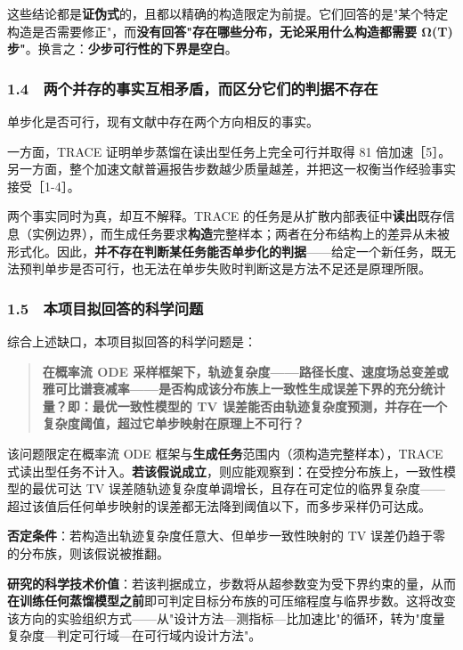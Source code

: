 \documentclass[12pt,a4paper]{ctexart}
\begin{document}
这些结论都是\textbf{证伪式}的，且都以精确的构造限定为前提。它们回答的是"某个特定构造是否需要修正"，而\textbf{没有回答"存在哪些分布，无论采用什么构造都需要 Ω(T) 步"}。换言之：\textbf{少步可行性的下界是空白}。

\subsubsection*{1.4　两个并存的事实互相矛盾，而区分它们的判据不存在}

单步化是否可行，现有文献中存在两个方向相反的事实。

一方面，TRACE 证明单步蒸馏在读出型任务上完全可行并取得 81 倍加速［5］。另一方面，整个加速文献普遍报告步数越少质量越差，并把这一权衡当作经验事实接受［1-4］。

两个事实同时为真，却互不解释。TRACE 的任务是从扩散内部表征中\textbf{读出}既存信息（实例边界），而生成任务要求\textbf{构造}完整样本；两者在分布结构上的差异从未被形式化。因此，\textbf{并不存在判断某任务能否单步化的判据}——给定一个新任务，既无法预判单步是否可行，也无法在单步失败时判断这是方法不足还是原理所限。

\subsubsection*{1.5　本项目拟回答的科学问题}

综合上述缺口，本项目拟回答的科学问题是：

\begin{quote}\small
\textbf{在概率流 ODE 采样框架下，轨迹复杂度——路径长度、速度场总变差或雅可比谱衰减率——是否构成该分布族上一致性生成误差下界的充分统计量？即：最优一致性模型的 TV 误差能否由轨迹复杂度预测，并存在一个复杂度阈值，超过它单步映射在原理上不可行？}

\end{quote}

该问题限定在概率流 ODE 框架与\textbf{生成任务}范围内（须构造完整样本），TRACE 式读出型任务不计入。\textbf{若该假说成立}，则应能观察到：在受控分布族上，一致性模型的最优可达 TV 误差随轨迹复杂度单调增长，且存在可定位的临界复杂度——超过该值后任何单步映射的误差都无法降到阈值以下，而多步采样仍可达成。

\textbf{否定条件}：若构造出轨迹复杂度任意大、但单步一致性映射的 TV 误差仍趋于零的分布族，则该假说被推翻。

\textbf{研究的科学技术价值}：若该判据成立，步数将从超参数变为受下界约束的量，从而\textbf{在训练任何蒸馏模型之前}即可判定目标分布族的可压缩程度与临界步数。这将改变该方向的实验组织方式——从"设计方法—测指标—比加速比"的循环，转为"度量复杂度—判定可行域—在可行域内设计方法"。
\end{document}

